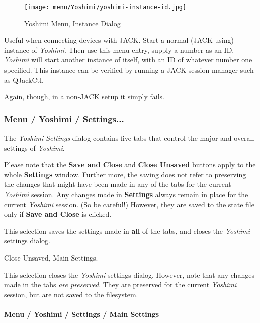 \begin{figure}[H]
   \centering 
   \texttt{[image: menu/Yoshimi/yoshimi-instance-id.jpg]}
   \caption{Yoshimi Menu, Instance Dialog}
   \label{fig:yoshimi_instance_dialog}
\end{figure}

   Useful when connecting devices with JACK.
   Start a normal (JACK-using) instance of \textsl{Yoshimi}.
   Then use this menu entry, supply a number as an ID.
   \textsl{Yoshimi} will start another instance
   of itself, with an ID of whatever number one specified.
   This instance can be verified by running a JACK session manager such as
   QJackCtl.

   Again, though, in a non-JACK setup it simply fails.  

\subsubsection{Menu / Yoshimi / Settings...}
\label{subsubsec:menu_yoshimi_settings}

   The \textsl{Yoshimi Settings} dialog contains five tabs that control the
   major and overall settings of \textsl{Yoshimi}.

   Please note that the \textbf{Save and Close} and \textbf{Close Unsaved}
   buttons apply to the whole \textbf{Settings} window.  Further more, the
   saving does not refer to preserving the changes that might have been made
   in any of the tabs for the current \textsl{Yoshimi} session.  Any changes
   made in \textbf{Settings} always remain in place for the current
   \textsl{Yoshimi} session.  (So be careful!)  However, they are saved to
   the state file only if \textbf{Save and Close} is clicked.

   \setcounter{ItemCounter}{0}      %

   This selection saves the settings made in \textbf{all} of the tabs,
   and closes the \textsl{Yoshimi} settings dialog.

   Close Unsaved, Main Settings.

   This selection closes the \textsl{Yoshimi} settings dialog.
   However, note that any changes made in the tabs
   \textsl{are preserved}.  They are preserved for the current
   \textsl{Yoshimi} session, but are not saved to the filesystem.
   
\paragraph{Menu / Yoshimi / Settings / Main Settings}
\label{paragraph:menu_yoshimi_settings_main_settings}

